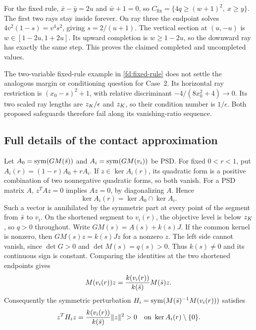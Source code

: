 For the fixed rule, $\bar x-\bar y=2u$ and $\bar w+1=0$, so
$C_{\mathrm{fix}}=\{4q\ge(w+1)^2,\ x\ge y\}$.
The first two rays stay inside forever. On ray three the endpoint solves
$4v^2(1-s)=v^4s^2$, giving $s=2/(u+1)$.
The vertical section at $(u,-u)$ is
$w\in[1-2u,1+2u]$. Its upward completion is
$w\ge1-2u$, so the downward ray has exactly the same step.
This proves the claimed completed and uncompleted values.

The two-variable fixed-rule example in \cref{fd:fixed-rule} does not settle
the analogous margin or conditioning question for Case~2. Its horizontal
ray restriction is $(x_0-s)^2+1$, with relative discriminant
$-4/(8x_0^2+4)\to0$. Its two scaled ray lengths are $z_K/\epsilon$ and
$z_K$, so their condition number is $1/\epsilon$. Both proposed safeguards
therefore fail along its vanishing-ratio sequence.

\subsection{Full details of the contact approximation}\label{dp:contact-proof}

Let $A_0=\operatorname{sym}(GM(\bar s))$ and $A_i=\operatorname{sym}(GM(v_i))$ be PSD.
For fixed $0<r<1$, put
$A_i(r)=(1-r)A_0+rA_i$. If $z\in\ker A_i(r)$, its quadratic form
is a positive combination of two nonnegative quadratic forms, so both
vanish. For a PSD matrix $A$, $z^TAz=0$ implies $Az=0$, by diagonalizing
$A$. Hence
\[
 \ker A_i(r)=\ker A_0\cap\ker A_i.
\]
Such a vector is annihilated by the symmetric part at every point of the
segment from $\bar s$ to $v_i$. On the shortened segment to $v_i(r)$,
the objective level is below $z_K$, so $q>0$ throughout. Write
$GM(s)=A(s)+k(s)J$. If the common kernel is nonzero, then
$GM(s)z=k(s)Jz$ for a nonzero $z$. The left side cannot vanish, since
$\det G>0$ and $\det M(s)=q(s)>0$. Thus $k(s)\ne0$ and its continuous
sign is constant. Comparing the identities at the two shortened endpoints
gives
\[
 M(v_i(r))z=\frac{k(v_i(r))}{k(\bar s)}M(\bar s)z.
\]
Consequently the symmetric perturbation
$H_i=\operatorname{sym}(M(\bar s)^{-1}M(v_i(r)))$ satisfies
\[
 z^TH_i z=\frac{k(v_i(r))}{k(\bar s)}\lVert z\rVert^2>0
 \quad\text{on }\ker A_i(r)\setminus\{0\}.
\]

